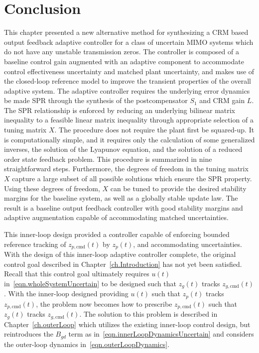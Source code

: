 \section{Conclusion}\label{sec.innerLoopConclusion}

This chapter presented a new alternative method for synthesizing a CRM based output feedback adaptive controller for a class of uncertain MIMO systems which do not have any unstable transmission zeros.
The controller is composed of a baseline control gain augmented with an adaptive component to accommodate control effectiveness uncertainty and matched plant uncertainty, and makes use of the closed-loop reference model to improve the transient properties of the overall adaptive system.
The adaptive controller requires the underlying error dynamics be made SPR through the synthesis of the postcompensator $S_{1}$ and CRM gain $L$.
The SPR relationship is enforced by reducing an underlying bilinear matrix inequality to a feasible linear matrix inequality through appropriate selection of a tuning matrix $X$.
The procedure does not require the plant first be squared-up.
It is computationally simple, and it requires only the calculation of some generalized inverses, the solution of the Lyapunov equation, and the solution of a reduced order state feedback problem.
This procedure is summarized in nine straightforward steps.
Furthermore, the degrees of freedom in the tuning matrix $X$ capture a large subset of all possible solutions which ensure the SPR property.
Using these degrees of freedom, $X$ can be tuned to provide the desired stability margins for the baseline system, as well as a globally stable update law.
The result is a baseline output feedback controller with good stability margins and adaptive augmentation capable of accommodating matched uncertainties.

This inner-loop design provided a controller capable of enforcing bounded reference tracking of $z_{p,\text{cmd}}(t)$ by $z_{p}(t)$, and accommodating uncertainties.
With the design of this inner-loop adaptive controller complete, the original control goal described in Chapter~\ref{ch.Introduction} has not yet been satisfied.
Recall that this control goal ultimately requires $u(t)$ in\ \eqref{eqn.wholeSystemUncertain} to be designed such that $z_{g}(t)$ tracks $z_{g,\text{cmd}}(t)$.
With the inner-loop designed providing $u(t)$ such that $z_{p}(t)$ tracks $z_{p,\text{cmd}}(t)$, the problem now becomes how to prescribe $z_{p,\text{cmd}}(t)$ such that $z_{g}(t)$ tracks $z_{g,\text{cmd}}(t)$.
The solution to this problem is described in Chapter~\ref{ch.outerLoop} which utilizes the existing inner-loop control design, but reintroduces the $B_{gd}$ term as in\ \eqref{eqn.innerLoopDynamicsUncertain} and considers the outer-loop dynamics in\ \eqref{eqn.outerLoopDynamics}.
